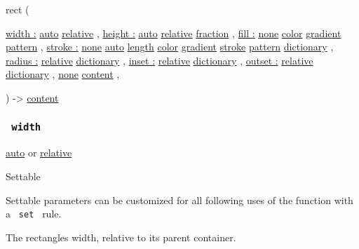 { rect } (

{ \hyperref[parameters-width]{width :}
\href{/docs/reference/foundations/auto/}{auto}
\href{/docs/reference/layout/relative/}{relative} , } {
\hyperref[parameters-height]{height :}
\href{/docs/reference/foundations/auto/}{auto}
\href{/docs/reference/layout/relative/}{relative}
\href{/docs/reference/layout/fraction/}{fraction} , } {
\hyperref[parameters-fill]{fill :}
\href{/docs/reference/foundations/none/}{none}
\href{/docs/reference/visualize/color/}{color}
\href{/docs/reference/visualize/gradient/}{gradient}
\href{/docs/reference/visualize/pattern/}{pattern} , } {
\hyperref[parameters-stroke]{stroke :}
\href{/docs/reference/foundations/none/}{none}
\href{/docs/reference/foundations/auto/}{auto}
\href{/docs/reference/layout/length/}{length}
\href{/docs/reference/visualize/color/}{color}
\href{/docs/reference/visualize/gradient/}{gradient}
\href{/docs/reference/visualize/stroke/}{stroke}
\href{/docs/reference/visualize/pattern/}{pattern}
\href{/docs/reference/foundations/dictionary/}{dictionary} , } {
\hyperref[parameters-radius]{radius :}
\href{/docs/reference/layout/relative/}{relative}
\href{/docs/reference/foundations/dictionary/}{dictionary} , } {
\hyperref[parameters-inset]{inset :}
\href{/docs/reference/layout/relative/}{relative}
\href{/docs/reference/foundations/dictionary/}{dictionary} , } {
\hyperref[parameters-outset]{outset :}
\href{/docs/reference/layout/relative/}{relative}
\href{/docs/reference/foundations/dictionary/}{dictionary} , } {
\hyperref[parameters-body]{}
\href{/docs/reference/foundations/none/}{none}
\href{/docs/reference/foundations/content/}{content} , }

) -\textgreater{} \href{/docs/reference/foundations/content/}{content}

\subsubsection{\texorpdfstring{\texttt{\ width\ }}{ width }}\label{parameters-width}

\href{/docs/reference/foundations/auto/}{auto} {or}
\href{/docs/reference/layout/relative/}{relative}

{{ Settable }}

\label{parameters-width-settable-tooltip}
Settable parameters can be customized for all following uses of the
function with a \texttt{\ set\ } rule.

The rectangle\textquotesingle s width, relative to its parent container.

